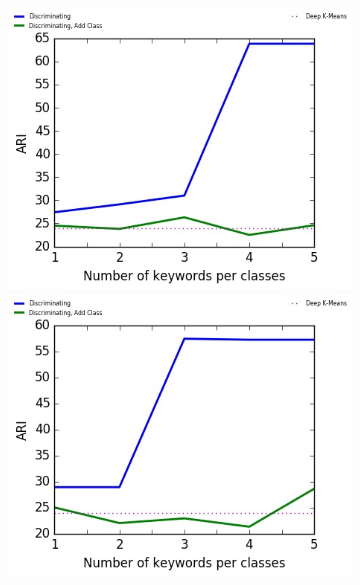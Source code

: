 \begin{figure}[!h]
\begin{subfigure}[b]{\textwidth}
\begin{minipage}{0.5\linewidth}
\end{minipage}
\end{subfigure}
\begin{subfigure}[b]{\textwidth}
\begin{minipage}{0.5\linewidth}
\centering
  \includegraphics[scale=0.49]{parts/res/dat_file/ari/RCV1.jpg}     
\end{minipage}
  \begin{minipage}{0.5\linewidth}
\centering
   \includegraphics[scale=0.49]{parts/res/dat_file/ari/RCV1_simple.jpg}     
\end{minipage}
\end{subfigure}

\end{figure}
